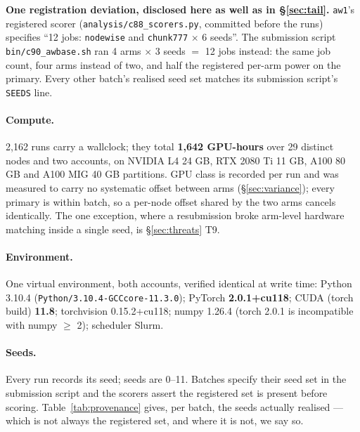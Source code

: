 \documentclass[10pt,letterpaper]{article}
\newcommand{\arm}[1]{\texttt{#1}}
\begin{document}
\textbf{One registration deviation, disclosed here as well as in \S\ref{sec:tail}.} \arm{aw1}'s
registered scorer (\texttt{analysis/c88\_scorers.py}, committed before the runs) specifies ``12
jobs: \arm{nodewise} and \arm{chunk777} $\times$ 6 seeds''. The submission script
\texttt{bin/c90\_awbase.sh} ran 4 arms $\times$ 3 seeds $=$ 12 jobs instead: the same job count,
four arms instead of two, and half the registered per-arm power on the primary. Every other batch's
realised seed set matches its submission script's \texttt{SEEDS} line.

\paragraph{Compute.}
2{,}162 runs carry a wallclock; they total \textbf{1{,}642 GPU-hours} over 29 distinct nodes and
two accounts, on NVIDIA L4 24 GB, RTX 2080 Ti 11 GB, A100 80 GB and A100 MIG 40 GB partitions. GPU
class is recorded per run and was measured to carry no systematic offset between arms
(\S\ref{sec:variance}); every primary is within batch, so a per-node offset shared by the two arms
cancels identically. The one exception, where a resubmission broke arm-level hardware matching
inside a single seed, is \S\ref{sec:threats} T9.

\paragraph{Environment.}
One virtual environment, both accounts, verified identical at write time: Python 3.10.4
(\texttt{Python/3.10.4-GCCcore-11.3.0}); PyTorch \textbf{2.0.1+cu118}; CUDA (torch build)
\textbf{11.8}; torchvision 0.15.2+cu118; numpy 1.26.4 (torch 2.0.1 is incompatible with
numpy $\ge$ 2); scheduler Slurm.

\paragraph{Seeds.}
Every run records its seed; seeds are 0--11. Batches specify their seed set in the submission
script and the scorers assert the registered set is present before scoring.
Table~\ref{tab:provenance} gives, per batch, the seeds actually realised --- which is not always
the registered set, and where it is not, we say so.
\end{document}
